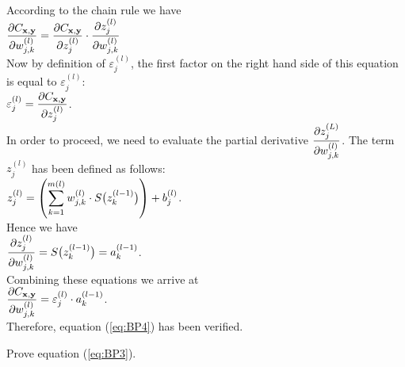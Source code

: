 According to the chain rule we have
\\[0.2cm]
\hspace*{1.3cm}
$ \displaystyle\frac{\partial C_{\mathbf{x}, \mathbf{y}}}{\partial w_{j,k}^{(l)}}  =  
  \frac{\partial C_{\mathbf{x}, \mathbf{y}}}{\partial z_j^{(l)}} \cdot \frac{\partial z_j^{(l)}}{\partial w_{j,k}^{(l)}} 
$ 
\\[0.2cm]
Now by definition of $\varepsilon_j^{(l)}$, the first factor on the right hand side of this equation is equal to $\varepsilon_j^{(l)}$: 
\\[0.2cm]
\hspace*{1.3cm}
$\displaystyle \varepsilon_j^{(l)} = \frac{\partial C_{\mathbf{x}, \mathbf{y}}}{\partial z_j^{(l)}}$.
\\[0.0cm]
In order to proceed, we need to evaluate the partial derivative
$\displaystyle\frac{\partial z_j^{(L)}}{\partial w_{j,k}^{(l)}}$.  The term $z_j^{(l)}$ has been defined as follows:
\\[0.2cm]
\hspace*{1.3cm}
$\displaystyle z_j^{(l)} = \left(\sum\limits_{k=1}^{m(l)} w_{j,k}^{(l)} \cdot S\bigl(z_k^{(l-1)}\bigr)\right) + b_j^{(l)}$.
\\[0.2cm]
Hence we have
\\[0.2cm]
\hspace*{1.3cm}
$\displaystyle\frac{\partial z_j^{(l)}}{\partial w_{j,k}^{(l)}} = S\bigl(z_k^{(l-1)}\bigr) = a_k^{(l-1)}$. 
\\[0.2cm]
Combining these equations we arrive at
\\[0.2cm]
\hspace*{1.3cm}
$ \displaystyle\frac{\partial C_{\mathbf{x}, \mathbf{y}}}{\partial w_{j,k}^{(l)}}  =  
  \varepsilon_j^{(l)} \cdot a_k^{(l-1)}
$. 
\\[0.2cm]
Therefore, equation (\ref{eq:BP4}) has been verified.

\exercise
Prove equation (\ref{eq:BP3}).
\eoxs

